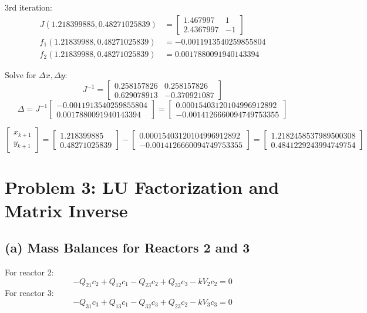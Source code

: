 \documentclass{article}
\begin{document}
3rd iteration:
\begin{align*}
   J(1.218399885, 0.48271025839) &= \begin{bmatrix} 1.467997 & 1 \\ 2.4367997 & -1 \end{bmatrix} \\
   f_1(1.21839988, 0.48271025839) &= -0.0011913540259855804\\
   f_2(1.21839988, 0.48271025839) &= 0.0017880091940143394
   \end{align*}
   
   Solve for \( \Delta x, \Delta y \):
   \[
   J^{-1} =\begin{bmatrix} 0.258157826 & 0.258157826 \\ 0.629078913 & -0.370921087 \end{bmatrix}
   \]
   \[
   \Delta = J^{-1} \begin{bmatrix} -0.0011913540259855804 \\ 0.0017880091940143394 \end{bmatrix} = \begin{bmatrix} 0.00015403120104996912892 \\ -0.0014126660094749753355 \end{bmatrix}
   \]
   
   \[
   \begin{bmatrix} x_{k+1} \\ y_{k+1} \end{bmatrix} = \begin{bmatrix} 1.218399885 \\ 0.48271025839 \end{bmatrix} - \begin{bmatrix} 0.00015403120104996912892 \\ -0.0014126660094749753355  \end{bmatrix} = \begin{bmatrix} 1.2182458537989500308 \\ 0.4841229243994749754 \end{bmatrix}
   \]
   

\section*{Problem 3: LU Factorization and Matrix Inverse}

\subsection*{(a) Mass Balances for Reactors 2 and 3}
For reactor 2:
\[
-Q_{21} c_2 + Q_{12} c_1 - Q_{23} c_2 + Q_{32} c_3 - k V_2 c_2 = 0
\]
For reactor 3:
\[
-Q_{31} c_3 + Q_{13} c_1 - Q_{32} c_3 + Q_{23} c_2 - k V_3 c_3 = 0
\]
\end{document}
